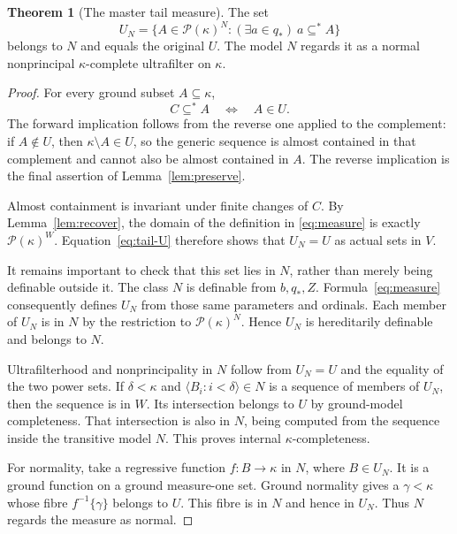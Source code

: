 \documentclass[11pt,letterpaper]{article}
\theoremstyle{definition}
\newtheorem{theorem}[definition]{Theorem}
\numberwithin{equation}{section}
\newcommand{\Pow}{\mathcal P}
\begin{document}
\begin{theorem}[The master tail measure]\label{thm:measure}
The set
\begin{equation}\label{eq:measure}
 U_N=\{A\in\Pow(\kappa)^N:(\exists a\in q_*)\ a\subseteq^* A\}
\end{equation}
belongs to $N$ and equals the original $U$. The model $N$ regards it as a normal nonprincipal $\kappa$-complete ultrafilter on $\kappa$.
\end{theorem}
\begin{proof}
For every ground subset $A\subseteq\kappa$,
\begin{equation}\label{eq:tail-U}
 C\subseteq^* A\quad\Longleftrightarrow\quad A\in U.
\end{equation}
The forward implication follows from the reverse one applied to the complement: if $A\notin U$, then $\kappa\setminus A\in U$, so the generic sequence is almost contained in that complement and cannot also be almost contained in $A$. The reverse implication is the final assertion of Lemma~\ref{lem:preserve}.

Almost containment is invariant under finite changes of $C$. By Lemma~\ref{lem:recover}, the domain of the definition in \eqref{eq:measure} is exactly $\Pow(\kappa)^W$. Equation~\eqref{eq:tail-U} therefore shows that $U_N=U$ as actual sets in $V$.

It remains important to check that this set lies in $N$, rather than merely being definable outside it. The class $N$ is definable from $b,q_*,Z$. Formula~\eqref{eq:measure} consequently defines $U_N$ from those same parameters and ordinals. Each member of $U_N$ is in $N$ by the restriction to $\Pow(\kappa)^N$. Hence $U_N$ is hereditarily definable and belongs to $N$.

Ultrafilterhood and nonprincipality in $N$ follow from $U_N=U$ and the equality of the two power sets. If $\delta<\kappa$ and $\langle B_i:i<\delta\rangle\in N$ is a sequence of members of $U_N$, then the sequence is in $W$. Its intersection belongs to $U$ by ground-model completeness. That intersection is also in $N$, being computed from the sequence inside the transitive model $N$. This proves internal $\kappa$-completeness.

For normality, take a regressive function $f:B\to\kappa$ in $N$, where $B\in U_N$. It is a ground function on a ground measure-one set. Ground normality gives a $\gamma<\kappa$ whose fibre $f^{-1}\{\gamma\}$ belongs to $U$. This fibre is in $N$ and hence in $U_N$. Thus $N$ regards the measure as normal.
\end{proof}
\end{document}
